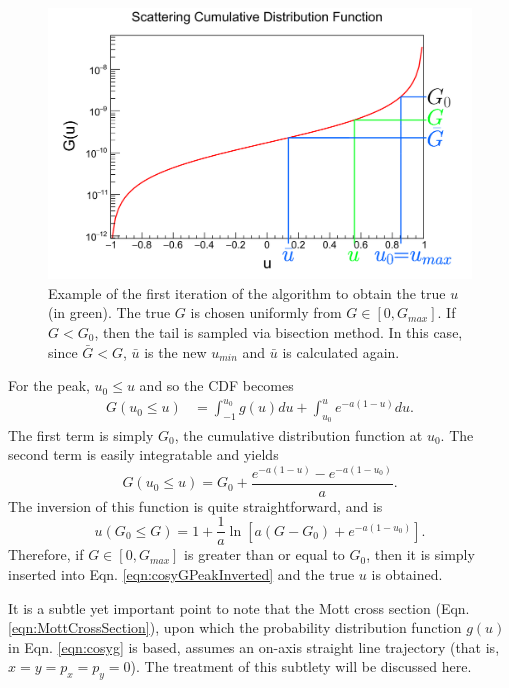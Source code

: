 \begin{figure}
  \centering
    \includegraphics[width=\textwidth]{Figures/scatdist_algorithm} 
  \caption[Example of the first iteration of the COSY CDF algorithm.]{Example of the first iteration of the algorithm to obtain the true $u$ (in green). The true $G$ is chosen uniformly from $G\in[0,G_{max}]$. If $G < G_0$, then the tail is sampled via bisection method. In this case, since $\bar{G} < G$, $\bar{u}$ is the new $u_{min}$ and $\bar{u}$ is calculated again.}
  \label{fig:scatdist_algorithm}
\end{figure}

For the peak, $u_0 \leq u$ and so the CDF becomes
\begin{align*}
G(u_0 \leq u)&=\int_{-1} ^{u_0} g(u) du + \int_{u_0} ^u e^{-a(1-u)} du.
\end{align*}
The first term is simply $G_0$, the cumulative distribution function at $u_0$. The second term is easily integratable and yields
\begin{equation}\label{eqn:cosyGPeak}
G(u_0 \leq u)=G_0 + \frac{e^{-a(1-u)}-e^{-a(1-u_0)}}{a}.
\end{equation}
The inversion of this function is quite straightforward, and is
\begin{equation} \label{eqn:cosyGPeakInverted}
u(G_0 \leq G)=1+\frac{1}{a} \ln \left[a(G-G_0)+e^{-a(1-u_0)}\right].
\end{equation}
Therefore, if $G \in [0,G_{max}]$ is greater than or equal to $G_0$, then it is simply inserted into Eqn. \ref{eqn:cosyGPeakInverted} and the true $u$ is obtained.

It is a subtle yet important point to note that the Mott cross section (Eqn. \ref{eqn:MottCrossSection}), upon which the probability distribution function $g(u)$ in Eqn. \ref{eqn:cosyg} is based, assumes an on-axis straight line trajectory (that is, $x=y=p_x = p_y =0$). The treatment of this subtlety will be discussed here.

